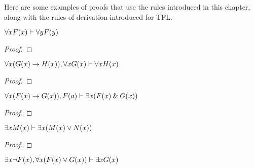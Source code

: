Here are some examples of proofs that use the rules introduced in this chapter, along with the rules of derivation introduced for TFL.

\begin{earg}
\begin{minipage}{10cm}
\item $\forall xF(x) \vdash \forall yF(y)$

\begin{proof}
	 \pr{}
	 
	 
\end{proof}
\bigskip
\end{minipage}

\item $\forall x(G(x) \rightarrow H(x)), \forall xG(x) \vdash \forall xH(x)$

\begin{proof}
	 \pr{}
	 \pr{}
	 
	 
	 
	 
\end{proof}
\bigskip

\begin{minipage}{10cm}
\item $\forall x(F(x) \rightarrow G(x)), F(a) \vdash \exists x(F(x) \mathbin{\&} G(x))$

\begin{proof}
	 \pr{}
	 \pr{}
	 
	 
	 
	 	
\end{proof}
\bigskip
\end{minipage}

\begin{minipage}{10cm}
\item $\exists xM(x) \vdash \exists x(M(x) \vee N(x))$

\begin{proof}
	 \pr{}
	\open
		 \as{}
		 
		 
	\close
	 
\end{proof}
\bigskip
\end{minipage}


\item $\exists x {\neg} F(x), \forall x(F(x) \vee G(x)) \vdash \exists xG(x)$


\end{earg}
